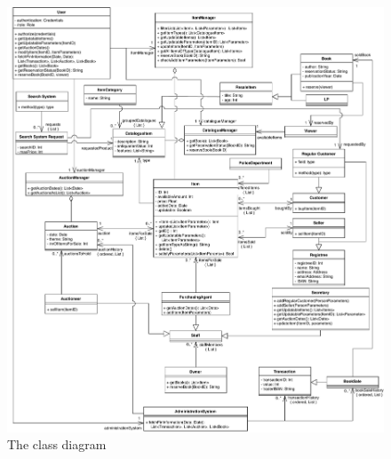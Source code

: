 \documentclass{article}
\begin{document}
\begin{figure}[H]
	\centering
	\includegraphics[scale=.85]{uml/classdiagramUPD3.pdf}
	\caption*{The class diagram}
\end{figure}
\end{document}

